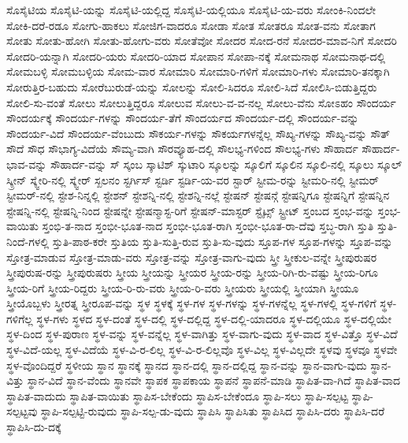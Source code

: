 {ಸೊಸೈಟಿಯ
ಸೊಸೈಟಿ-ಯನ್ನು
ಸೊಸೈಟಿ-ಯಲ್ಲಿದ್ದ
ಸೊಸೈಟಿ-ಯಲ್ಲಿಯೂ
ಸೊಸೈಟಿ-ಯ-ವರು
ಸೋಂಕಿ-ನಿಂದಲೇ
ಸೋಕಿ-ದರೆ-ರಡೂ
ಸೋಗು-ಹಾಕಲು
ಸೋಜಿಗ-ವಾದರೂ
ಸೋಡಾ
ಸೋತ
ಸೋತರೂ
ಸೋತ-ವನು
ಸೋತಾಗ
ಸೋತು
ಸೋತು-ಹೋಗಿ
ಸೋತು-ಹೋಗು-ವರು
ಸೋತೆವೋ
ಸೋದರ
ಸೋದ-ರನೆ
ಸೋದರ-ಮಾವ-ನಿಗೆ
ಸೋದರಿ
ಸೋದರಿ-ಯನ್ನಾಗಿ
ಸೋದರಿ-ಯರು
ಸೋದರಿ-ಯಾದ
ಸೋಪಾನ
ಸೋಪಾ-ನಕ್ಕೆ
ಸೋಮನಾಥ
ಸೋಮನಾಥ-ದಲ್ಲಿ
ಸೋಮಬಳ್ಳಿ
ಸೋಮಬಳ್ಳಿಯ
ಸೋಮ-ವಾರ
ಸೋಮಾರಿ
ಸೋಮಾರಿ-ಗಳಿಗೆ
ಸೋಮಾರಿ-ಗಳು
ಸೋಮಾರಿ-ತನಕ್ಕಾಗಿ
ಸೋರುತ್ತಿರ-ಬಹುದು
ಸೋರೆಬುರುಡೆ-ಯನ್ನು
ಸೋಲನ್ನು
ಸೋಲಿ-ಸಿದರೂ
ಸೋಲಿ-ಸಿದೆ
ಸೋಲಿಸಿ-ಬಿಡುತ್ತಿದ್ದರು
ಸೋಲಿ-ಸು-ವಂತೆ
ಸೋಲು
ಸೋಲುತ್ತಿದ್ದರೂ
ಸೋಲುವ
ಸೋಲು-ವ-ವ-ನಲ್ಲ
ಸೋಲು-ವೆನು
ಸೋಽಹಂ
ಸೌಂದರ್ಯ
ಸೌಂದರ್ಯಕ್ಕೆ
ಸೌಂದರ್ಯ-ಗಳನ್ನು
ಸೌಂದರ್ಯ-ತೆಗೆ
ಸೌಂದರ್ಯದ
ಸೌಂದರ್ಯ-ದಲ್ಲಿ
ಸೌಂದರ್ಯ-ವನ್ನು
ಸೌಂದರ್ಯ-ವಿದೆ
ಸೌಂದರ್ಯ-ವೆಂಬುದು
ಸೌಕರ್ಯ-ಗಳನ್ನು
ಸೌಕರ್ಯಗಳನ್ನೆಲ್ಲ
ಸೌಖ್ಯ-ಗಳನ್ನು
ಸೌಖ್ಯ-ವನ್ನು
ಸೌತ್
ಸೌದೆ
ಸೌಧ
ಸೌಭಾಗ್ಯ-ವಿದೆಯೆ
ಸೌಮ್ಯ-ವಾಗಿ
ಸೌರವ್ಯೂಹ-ದಲ್ಲಿ
ಸೌಲಭ್ಯ-ಗಳಿಂದ
ಸೌಲಭ್ಯ-ಗಳು
ಸೌಹಾರ್ದ
ಸೌಹಾರ್ದ-ಭಾವ-ವನ್ನು
ಸೌಹಾರ್ದ-ವನ್ನು
ಸ್
ಸ್ಕಂಬ
ಸ್ಕಾಟಿಶ್
ಸ್ಕುಟಾರಿ
ಸ್ಕೂಲನ್ನು
ಸ್ಕೂಲಿಗೆ
ಸ್ಕೂಲಿನ
ಸ್ಕೂಲಿ-ನಲ್ಲಿ
ಸ್ಕೂಲು
ಸ್ಕೂಲ್
ಸ್ಕ್ರೀನ್
ಸ್ಕ್ವೇರಿ-ನಲ್ಲಿ
ಸ್ಕ್ವೇರ್
ಸ್ಖಲನಂ
ಸ್ಟರ್ಗಿಸ್
ಸ್ಟರ್ಡಿ
ಸ್ಟರ್ಡಿ-ಯ-ವರ
ಸ್ಟಾರ್
ಸ್ಟೀಮ-ರನ್ನು
ಸ್ಟೀಮರಿ-ನಲ್ಲಿ
ಸ್ಟೀಮರ್
ಸ್ಟೀಮರ್-ನಲ್ಲಿ
ಸ್ಟೇಶ-ನಿನ್ನಲ್ಲಿ
ಸ್ಟೇಶನ್
ಸ್ಟೇಶನ್ನಿ-ನಲ್ಲಿ
ಸ್ಟೇಶನ್ನಿ-ನಲ್ಲೆ
ಸ್ಟೇಷನ್
ಸ್ಟೇಷನ್ಗೆ
ಸ್ಟೇಷನ್ನಿಗೂ
ಸ್ಟೇಷನ್ನಿಗೆ
ಸ್ಟೇಷನ್ನಿನ
ಸ್ಟೇಷನ್ನಿ-ನಲ್ಲಿ
ಸ್ಟೇಷನ್ನಿ-ನಿಂದ
ಸ್ಟೇಷನ್ನೇ
ಸ್ಟೇಷನ್ಮಾಸ್ಟ-ರಿಗೆ
ಸ್ಟೇಷನ್-ಮಾಸ್ಟರ್
ಸ್ಟೈಟ್ಸ್
ಸ್ಟ್ರೀಟ್
ಸ್ತಂಬದ
ಸ್ತಂಭ-ವನ್ನು
ಸ್ತಂಭ-ವಾಯಿತು
ಸ್ತಂಭಿ-ತ-ನಾದ
ಸ್ತಂಭೀ-ಭೂತ-ನಾದ
ಸ್ತಂಭೀ-ಭೂತ-ರಾಗಿ
ಸ್ತಂಭೀ-ಭೂತ-ರಾ-ದೆವು
ಸ್ತಬ್ಧ-ರಾಗಿ
ಸ್ತುತಿ
ಸ್ತುತಿ-ನಿಂದೆ-ಗಳಲ್ಲಿ
ಸ್ತುತಿ-ಪಾಠ-ಕರೇ
ಸ್ತುತಿಯ
ಸ್ತುತಿ-ಸುತ್ತಿ-ರುವ
ಸ್ತುತಿ-ಸು-ವುದು
ಸ್ತೂಪ-ಗಳ
ಸ್ತೂಪ-ಗಳನ್ನು
ಸ್ತೂಪ-ವನ್ನು
ಸ್ತೋತ್ರ-ಮಾಡುವ
ಸ್ತೋತ್ರ-ಮಾಡು-ವರು
ಸ್ತೋತ್ರ-ವನ್ನು
ಸ್ತೋತ್ರ-ವಾಗು-ವುದು
ಸ್ತ್ರೀ
ಸ್ತ್ರೀಕುಲ-ವನ್ನೇ
ಸ್ತ್ರೀಪುರುಷರ
ಸ್ತ್ರೀಪುರುಷ-ರನ್ನು
ಸ್ತ್ರೀಪುರುಷರು
ಸ್ತ್ರೀಯ
ಸ್ತ್ರೀಯನ್ನು
ಸ್ತ್ರೀಯರ
ಸ್ತ್ರೀಯ-ರನ್ನು
ಸ್ತ್ರೀಯ-ರಿಗಿ-ರು-ವಷ್ಟು
ಸ್ತ್ರೀಯ-ರಿಗೂ
ಸ್ತ್ರೀಯ-ರಿಗೆ
ಸ್ತ್ರೀಯ-ರಿದ್ದರು
ಸ್ತ್ರೀಯ-ರಿ-ರು-ವರು
ಸ್ತ್ರೀಯ-ರಿ-ವರು
ಸ್ತ್ರೀಯರು
ಸ್ತ್ರೀಯಲ್ಲಿ
ಸ್ತ್ರೀಯಾಗಿ
ಸ್ತ್ರೀಯೂ
ಸ್ತ್ರೀಯೊಬ್ಬಳು
ಸ್ತ್ರೀರತ್ನ
ಸ್ತ್ರೀರೂಪ-ವನ್ನು
ಸ್ಥಳ
ಸ್ಥಳಕ್ಕೆ
ಸ್ಥಳ-ಗಳ
ಸ್ಥಳ-ಗಳನ್ನು
ಸ್ಥಳ-ಗಳನ್ನೆಲ್ಲ
ಸ್ಥಳ-ಗಳಲ್ಲಿ
ಸ್ಥಳ-ಗಳಿಗೆ
ಸ್ಥಳ-ಗಳಿಗೆಲ್ಲ
ಸ್ಥಳ-ಗಳು
ಸ್ಥಳದ
ಸ್ಥಳ-ದಂತೆ
ಸ್ಥಳ-ದಲ್ಲಿ
ಸ್ಥಳ-ದಲ್ಲಿದ್ದ
ಸ್ಥಳ-ದಲ್ಲಿ-ಯಾದರೂ
ಸ್ಥಳ-ದಲ್ಲಿಯೂ
ಸ್ಥಳ-ದಲ್ಲಿಯೇ
ಸ್ಥಳ-ದಿಂದ
ಸ್ಥಳ-ಪುರಾಣ
ಸ್ಥಳ-ವನ್ನು
ಸ್ಥಳ-ವನ್ನೆಲ್ಲ
ಸ್ಥಳ-ವಾಗಿತ್ತು
ಸ್ಥಳ-ವಾಗು-ವುದು
ಸ್ಥಳ-ವಾದ
ಸ್ಥಳ-ವಿತ್ತೊ
ಸ್ಥಳ-ವಿದೆ
ಸ್ಥಳ-ವಿದೆ-ಯಲ್ಲ
ಸ್ಥಳ-ವಿದೆಯೆ
ಸ್ಥಳ-ವಿ-ರ-ಲಿಲ್ಲ
ಸ್ಥಳ-ವಿ-ರ-ಲಿಲ್ಲವೊ
ಸ್ಥಳ-ವಿಲ್ಲ
ಸ್ಥಳ-ವಿಲ್ಲದೇ
ಸ್ಥಳವು
ಸ್ಥಳವೂ
ಸ್ಥಳವೇ
ಸ್ಥಳ-ವೊಂದಿದ್ದರೆ
ಸ್ಥಳೀಯ
ಸ್ಥಾನ
ಸ್ಥಾನಕ್ಕೆ
ಸ್ಥಾನದ
ಸ್ಥಾನ-ದಲ್ಲಿ
ಸ್ಥಾನ-ದಲ್ಲಿದ್ದ
ಸ್ಥಾನ-ವನ್ನು
ಸ್ಥಾನ-ವಾಗು-ವುದು
ಸ್ಥಾನ-ವಿತ್ತು
ಸ್ಥಾನ-ವಿದೆ
ಸ್ಥಾನ-ವೆಂದು
ಸ್ಥಾನವೇ
ಸ್ಥಾಪಕ
ಸ್ಥಾಪಕಾಯ
ಸ್ಥಾಪನೆ
ಸ್ಥಾಪನೆ-ಮಾಡಿ
ಸ್ಥಾಪಿತ-ವಾ-ಗಿದೆ
ಸ್ಥಾಪಿತ-ವಾದ
ಸ್ಥಾಪಿತ-ವಾದುದು
ಸ್ಥಾಪಿತ-ವಾಯಿತು
ಸ್ಥಾಪಿಸ-ಬೇಕೆಂದು
ಸ್ಥಾಪಿಸ-ಬೇಕೆಂದೂ
ಸ್ಥಾಪಿ-ಸಲು
ಸ್ಥಾಪಿ-ಸಲ್ಪಟ್ಟ
ಸ್ಥಾಪಿ-ಸಲ್ಪಟ್ಟವು
ಸ್ಥಾಪಿ-ಸಲ್ಪಟ್ಟಿ-ರುವುದು
ಸ್ಥಾಪಿ-ಸಲ್ಪ-ಡು-ವುದು
ಸ್ಥಾಪಿಸಿ
ಸ್ಥಾಪಿಸಿತು
ಸ್ಥಾಪಿಸಿದ
ಸ್ಥಾಪಿಸಿ-ದರು
ಸ್ಥಾಪಿಸಿ-ದರೆ
ಸ್ಥಾಪಿಸಿ-ದು-ದಕ್ಕೆ
}
